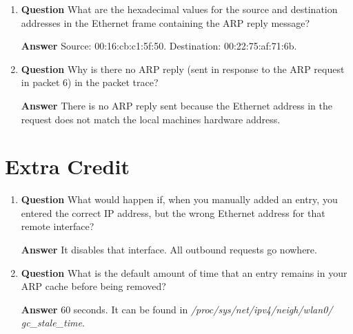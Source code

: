 \documentclass[12pt,letterpaper]{article}
\newcommand{\q}{\textbf{Question} }
\newcommand{\ans}{\textbf{Answer} }
\begin{document}
\begin{enumerate}
\begin{enumerate}
        \ans 0x0002 (Reply).

        \item \q Where in the ARP message does the ``answer'' to the earlier
            ARP request appear -- the IP address of the machine having the
            Ethernet address of the machine whose corresponding IP address
            is being queried?

        \ans 7 bytes after the \emph{opcode}. The 6 bytes after the \emph{
            opcode} is used for the Ethernet address of the queried machine.
    \end{enumerate}

\item \q What are the hexadecimal values for the source and destination
    addresses in the Ethernet frame containing the ARP reply message?

\ans Source: 00:16:cb:c1:5f:50. Destination: 00:22:75:af:71:6b.

\item \q Why is there no ARP reply (sent in response to the ARP request in packet
    6) in the packet trace?

\ans There is no ARP reply sent because the Ethernet address in the request
    does not match the local machines hardware address.
\end{enumerate}

\pagebreak

\pagebreak

\section{Extra Credit}
\begin{enumerate}
    \item \q What would happen if, when you manually added an entry, you
        entered the correct IP address, but the wrong Ethernet address
        for that remote interface?
    
    \ans It disables that interface. All outbound requests go nowhere.

    \item \q What is the default amount of time that an entry remains in your
        ARP cache before being removed?

    \ans 60 seconds. It can be found in \emph{/proc/sys/net/ipv4/neigh/wlan0/
        gc\_stale\_time}.

\end{enumerate}
\end{document}
